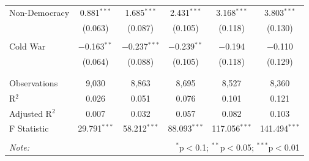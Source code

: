 \documentclass[
  12pt,
]{report}
\begin{document}
\begin{table}
{\begin{tabular}{@{\extracolsep{10pt}}lccccc}
 Non-Democracy & 0.881$^{***}$ & 1.685$^{***}$ & 2.431$^{***}$ & 3.168$^{***}$ & 3.803$^{***}$ \\ 
  & (0.063) & (0.087) & (0.105) & (0.118) & (0.130) \\ 
  & & & & & \\ 
 Cold War & $-$0.163$^{**}$ & $-$0.237$^{***}$ & $-$0.239$^{**}$ & $-$0.194 & $-$0.110 \\ 
  & (0.064) & (0.088) & (0.105) & (0.118) & (0.129) \\ 
  & & & & & \\ 
\hline \\[-1.8ex] 
Observations & 9,030 & 8,863 & 8,695 & 8,527 & 8,360 \\ 
R$^{2}$ & 0.026 & 0.051 & 0.076 & 0.101 & 0.121 \\ 
Adjusted R$^{2}$ & 0.007 & 0.032 & 0.057 & 0.082 & 0.103 \\ 
F Statistic & 29.791$^{***}$ & 58.212$^{***}$ & 88.093$^{***}$ & 117.056$^{***}$ & 141.494$^{***}$ \\ 
\hline 
\hline \\[-1.8ex] 
\textit{Note:}  & \multicolumn{5}{r}{$^{*}$p$<$0.1; $^{**}$p$<$0.05; $^{***}$p$<$0.01} \\ 
\end{tabular}

}

\end{table}%
\end{document}
